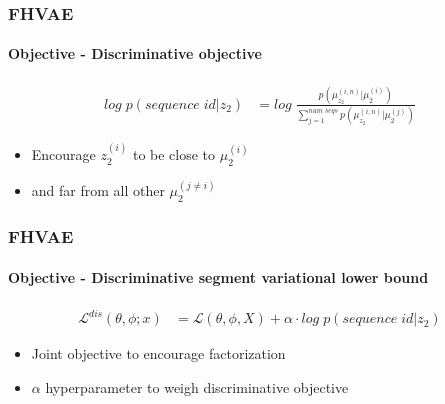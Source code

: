 \documentclass[9pt]{beamer}
\begin{document}
\begin{frame}
\frametitle{FHVAE}
\framesubtitle{Objective - Discriminative objective}
\begin{align*}
log\;p(sequence\;id | z_2)& = log\;\frac{p(\mu_{z_2}^{(i,n)}|\mu_2^{(i)})}{\sum^{num\;seqs}_{j=1}	p(\mu_{z_2}^{(i,n)}|\mu_2^{(j)})}
\end{align*}
\begin{itemize}
	\item Encourage $z_2^{(i)}$ to be close to $\mu_2^{(i)}$
	\item and far from all other $\mu_2^{(j \neq i)}$
\end{itemize}
\end{frame} 



\begin{frame}
\frametitle{FHVAE}
\framesubtitle{Objective - Discriminative segment variational lower bound}
\begin{align*}
\mathcal{L}^{dis}(\theta, \phi;x)& = \mathcal{L}(\theta, \phi, X) + \alpha \cdot log\;p(sequence\;id | z_2)
\end{align*}
\begin{itemize}
	\item Joint objective to encourage factorization
	\item $\alpha$ hyperparameter to weigh discriminative objective
\end{itemize}
\end{frame} 
\end{document}
